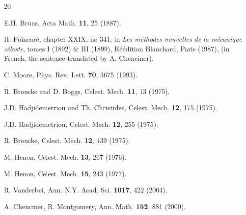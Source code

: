 \documentclass[twocolumn,showpacs,showkeys,preprintnumbers,amsmath,amssymb]{revtex4}
\begin{document}
\begin{thebibliography}{20}

E.H. Bruns, 
Acta Math. {\bf 11}, 25 (1887).

H. Poincar{\' e}, chapter XXIX, no 341, in
{\it Les m{\' e}thodes nouvelles de la m{\' e}canique c{\' e}leste}, tomes I (1892) 
\& III (1899), R{\' e}{\' e}dition Blanchard, Paris (1987), 
(in French, the sentence translated by A. Chenciner).

C. Moore, 
Phys. Rev. Lett. {\bf 70}, 3675 (1993).


R. Broucke and D. Boggs,
Celest. Mech. {\bf 11}, 13 (1975).


J.D. Hadjidemetriou and Th. Christides, 
Celest. Mech. {\bf 12}, 175 (1975).

J.D. Hadjidemetriou, 
Celest. Mech. {\bf 12}, 255 (1975).

R. Broucke, 
Celest. Mech. {\bf 12}, 439 (1975).

M. Henon, 
Celest. Mech. {\bf 13}, 267 (1976).

M. Henon, 
Celest. Mech. {\bf 15}, 243 (1977).

R. Vanderbei, 
Ann. N.Y. Acad. Sci. {\bf 1017}, 422 (2004).

A. Chenciner, R. Montgomery,
Ann. Math. {\bf 152}, 881 (2000).


\end{thebibliography}
\end{document}

